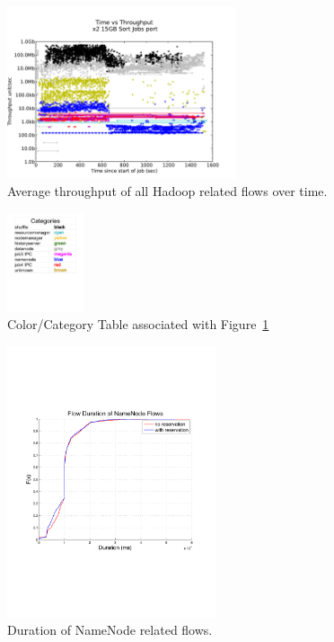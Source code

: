 \begin{figure}
\centering
\includegraphics[width=0.6\textwidth]{figures/clock_v_throughput_port.pdf}
\caption{Average throughput of all Hadoop related flows over time.}
\label{fig:tput}
\end{figure}

\begin{figure}
\centering
\includegraphics[width=0.2\textwidth]{figures/categories.pdf}
\caption{Color/Category Table associated with Figure~\ref{fig:tput}}
\label{fig:cats}
\end{figure}

\begin{figure}
\centering
\includegraphics[width=0.55\textwidth]{figures/flow_durations.pdf}
\caption{Duration of NameNode related flows.}
\label{fig:duration_cdf}
\end{figure}

